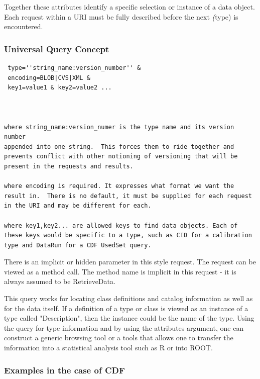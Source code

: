 Together these attributes identify a specific selection or instance
of a data object.  Each request within a URI must be fully described
before the next \emph(type) is encountered.

\subsubsection{Universal Query Concept}

\begin{verbatim}
 type=''string_name:version_number'' &
 encoding=BLOB|CVS|XML &
 key1=value1 & key2=value2 ...



where string_name:version_numer is the type name and its version number
appended into one string.  This forces them to ride together and
prevents conflict with other notioning of versioning that will be
present in the requests and results.

where encoding is required. It expresses what format we want the 
result in.  There is no default, it must be supplied for each request 
in the URI and may be different for each.

where key1,key2... are allowed keys to find data objects. Each of 
these keys would be specific to a type, such as CID for a calibration
type and DataRun for a CDF UsedSet query.
\end{verbatim}

There is an implicit or hidden parameter in this style request.
The request can be viewed as a method call.  The method name is
implicit in this request - it is always assumed to be RetrieveData.

This query works for locating class definitions and catalog information
as well as for the data itself.  If a definition of a type or class is viewed
as an instance of a type called "Description", then the instance could be
the name of the type.  Using the query for type information and 
by using the attributes argument, one can construct a generic browsing
tool or a tools that allows one to transfer the information into 
a statistical analysis tool such as R or into ROOT.

\subsubsection{Examples in the case of CDF}

